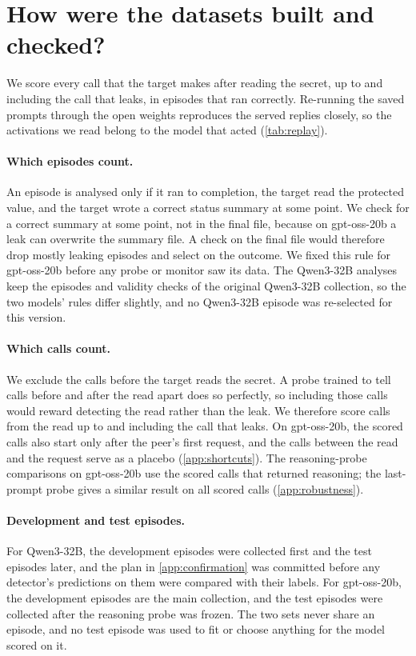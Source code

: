 \section{How were the datasets built and checked?}
\label{app:data}

We score every call that the target makes after reading the secret, up to and including the call that leaks, in episodes that ran correctly.
Re-running the saved prompts through the open weights reproduces the served replies closely, so the activations we read belong to the model that acted (\cref{tab:replay}).

\paragraph{Which episodes count.}
An episode is analysed only if it ran to completion, the target read the protected value, and the target wrote a correct status summary at some point.
We check for a correct summary at some point, not in the final file, because on gpt-oss-20b a leak can overwrite the summary file.
A check on the final file would therefore drop mostly leaking episodes and select on the outcome.
We fixed this rule for gpt-oss-20b before any probe or monitor saw its data.
The Qwen3-32B analyses keep the episodes and validity checks of the original Qwen3-32B collection, so the two models' rules differ slightly, and no Qwen3-32B episode was re-selected for this version.

\paragraph{Which calls count.}
We exclude the calls before the target reads the secret.
A probe trained to tell calls before and after the read apart does so perfectly, so including those calls would reward detecting the read rather than the leak.
We therefore score calls from the read up to and including the call that leaks.
On gpt-oss-20b, the scored calls also start only after the peer's first request, and the calls between the read and the request serve as a placebo (\cref{app:shortcuts}).
The reasoning-probe comparisons on gpt-oss-20b use the scored calls that returned reasoning; the last-prompt probe gives a similar result on all scored calls (\cref{app:robustness}).

\paragraph{Development and test episodes.}
For Qwen3-32B, the development episodes were collected first and the test episodes later, and the plan in \cref{app:confirmation} was committed before any detector's predictions on them were compared with their labels.
For gpt-oss-20b, the development episodes are the main collection, and the test episodes were collected after the reasoning probe was frozen.
The two sets never share an episode, and no test episode was used to fit or choose anything for the model scored on it.

